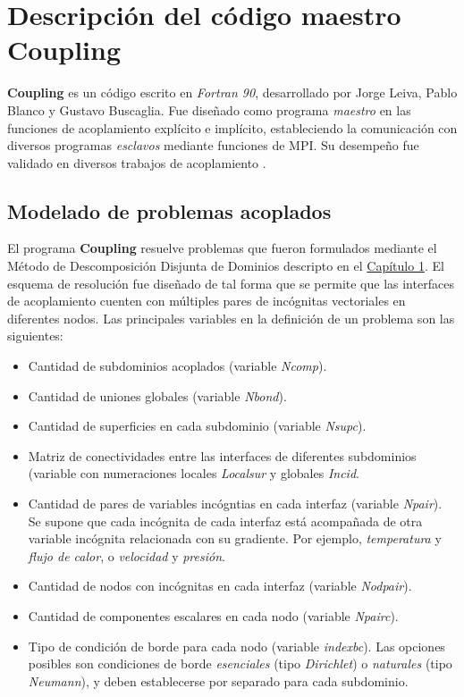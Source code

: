 \chapter{Descripción del código maestro \textbf{Coupling}}
\label{C:coupling}

\textbf{Coupling} es un código escrito en \textit{Fortran 90}, desarrollado por Jorge Leiva, Pablo Blanco y Gustavo Buscaglia.
Fue diseñado como programa \textit{maestro} en las funciones de acoplamiento explícito e implícito,
estableciendo la comunicación con diversos programas \textit{esclavos} mediante funciones de MPI.
Su desempeño fue validado en diversos trabajos de acoplamiento \cite{coup-0d3d} \cite{coup-black} \cite{coup-hyd} \cite{coup-strong}.

\section{Modelado de problemas acoplados}
\label{ap1:definicion}
El programa \textbf{Coupling} resuelve problemas que fueron formulados mediante el Método de Descomposición Disjunta de Dominios descripto en el \hyperlink{chapter.1}{Capítulo 1}.
El esquema de resolución fue diseñado de tal forma que se permite que las interfaces de acoplamiento cuenten con múltiples pares de incógnitas vectoriales en diferentes nodos.
Las principales variables en la definición de un problema son las siguientes:
\begin{itemize}
\item Cantidad de subdominios acoplados (variable \textit{Ncomp}).
\item Cantidad de uniones globales (variable \textit{Nbond}).
\item Cantidad de superficies en cada subdominio (variable \textit{Nsupc}).
\item Matriz de conectividades entre las interfaces de diferentes subdominios (variable con numeraciones locales \textit{Localsur} y globales \textit{Incid}.
\item Cantidad de pares de variables incógntias en cada interfaz (variable \textit{Npair}).
Se supone que cada incógnita de cada interfaz está acompañada de otra variable incógnita relacionada con su gradiente.
Por ejemplo, \textit{temperatura} y \textit{flujo de calor}, o \textit{velocidad} y \textit{presión}.
\item Cantidad de nodos con incógnitas en cada interfaz (variable \textit{Nodpair}).
\item Cantidad de componentes escalares en cada nodo (variable \textit{Npairc}).
\item Tipo de condición de borde para cada nodo (variable \textit{indexbc}).
Las opciones posibles son condiciones de borde \textit{esenciales} (tipo \textit{Dirichlet}) o \textit{naturales} (tipo \textit{Neumann}), y deben establecerse por separado para cada subdominio.
\end{itemize}
